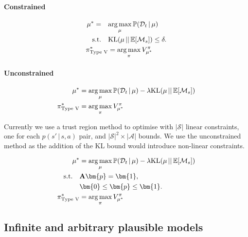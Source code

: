 \paragraph{Constrained}
\begin{equation}
\begin{aligned}
\mu^{*} = \quad &\underset{\mu}{\arg\max} \, \mathbb{P}(\mathcal{D}_t \, | \, \mu)\\
\textrm{s.t.} \quad & \textrm{KL}(\mu \, || \, \mathbb{E}[\mathcal{M}_s]) \leq \delta.\\
\pi^{*}_{\textrm{Type V}} &= \underset{\pi}{\arg\max} \, V_{\mu^{*}}^\pi
\end{aligned}
\end{equation}

\paragraph{Unconstrained}
\begin{equation}
\begin{aligned}
\mu^{*} &= \underset{\mu}{\arg\max} \, \mathbb{P}(\mathcal{D}_t \, | \, \mu) - \lambda\textrm{KL}(\mu \, || \, \mathbb{E}[\mathcal{M}_s])\\
\pi^{*}_{\textrm{Type V}} &= \underset{\pi}{\arg\max} \, V_{\mu^{*}}^\pi
\end{aligned}
\end{equation}

Currently we use a trust region method to optimise with $|\mathcal{S}|$ linear constraints, one for each $p(s' \, | \, s, a)$ pair, and $|\mathcal{S}|^2\times |\mathcal{A}|$ bounds. We use the unconstrained method as the addition of the KL bound would introduce non-linear constraints.

\begin{equation}
\begin{aligned}
\mdp^{*} &= \underset{\mdp}{\arg\max} \, \Pr(\mathcal{D}_t \, | \, \mdp) - \lambda\textrm{KL}(\mdp \, || \, \mathbb{E}[\mathcal{M}_s])\\
\textrm{s.t.} \quad & \mathbf{A}\bm{p} = \bm{1},\\
\quad \quad & \bm{0} \leq \bm{p} \leq \bm{1}.\\
\pol^{*}_{\textrm{Type V}} &= \underset{\pol}{\arg\max} \, V_{\mdp^{*}}^\pol
\end{aligned}
\end{equation}

\subsection{Infinite and arbitrary plausible models}

